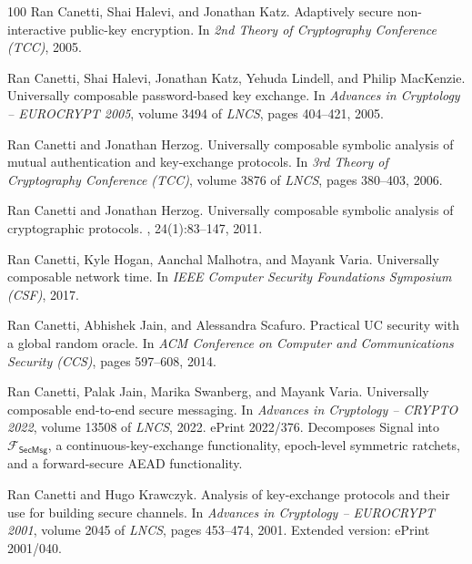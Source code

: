 \documentclass[11pt,a4paper]{article}
\begin{document}
\begin{thebibliography}{100}
Ran Canetti, Shai Halevi, and Jonathan Katz.
\newblock Adaptively secure non-interactive public-key encryption.
\newblock In {\em 2nd Theory of Cryptography Conference (TCC)}, 2005.

Ran Canetti, Shai Halevi, Jonathan Katz, Yehuda Lindell, and Philip MacKenzie.
\newblock Universally composable password-based key exchange.
\newblock In {\em Advances in Cryptology -- EUROCRYPT 2005}, volume 3494 of
  {\em LNCS}, pages 404--421, 2005.

Ran Canetti and Jonathan Herzog.
\newblock Universally composable symbolic analysis of mutual authentication and
  key-exchange protocols.
\newblock In {\em 3rd Theory of Cryptography Conference (TCC)}, volume 3876 of
  {\em LNCS}, pages 380--403, 2006.

Ran Canetti and Jonathan Herzog.
\newblock Universally composable symbolic analysis of cryptographic protocols.
, 24(1):83--147, 2011.

Ran Canetti, Kyle Hogan, Aanchal Malhotra, and Mayank Varia.
\newblock Universally composable network time.
\newblock In {\em IEEE Computer Security Foundations Symposium (CSF)}, 2017.

Ran Canetti, Abhishek Jain, and Alessandra Scafuro.
\newblock Practical {UC} security with a global random oracle.
\newblock In {\em ACM Conference on Computer and Communications Security
  (CCS)}, pages 597--608, 2014.

Ran Canetti, Palak Jain, Marika Swanberg, and Mayank Varia.
\newblock Universally composable end-to-end secure messaging.
\newblock In {\em Advances in Cryptology -- CRYPTO 2022}, volume 13508 of {\em
  LNCS}, 2022.
\newblock ePrint 2022/376. Decomposes Signal into
  $\mathcal{F}_{\mathsf{SecMsg}}$, a continuous-key-exchange functionality,
  epoch-level symmetric ratchets, and a forward-secure AEAD functionality.

Ran Canetti and Hugo Krawczyk.
\newblock Analysis of key-exchange protocols and their use for building secure
  channels.
\newblock In {\em Advances in Cryptology -- EUROCRYPT 2001}, volume 2045 of
  {\em LNCS}, pages 453--474, 2001.
\newblock Extended version: ePrint 2001/040.


\end{thebibliography}
\end{document}
